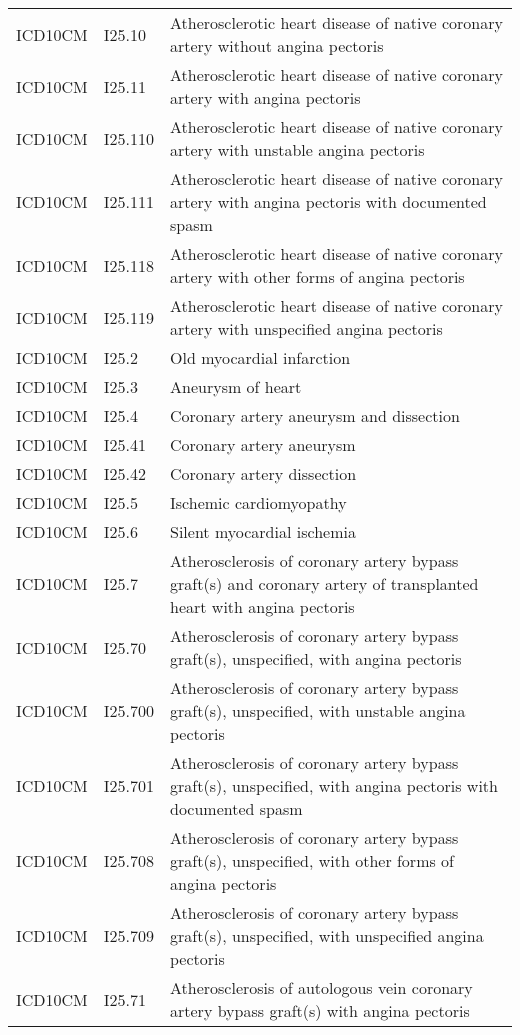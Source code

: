 \begin{longtable}{p{}p{}p{}}
  ICD10CM & I25.10 & Atherosclerotic heart disease of native coronary artery without angina pectoris \\ 
  ICD10CM & I25.11 & Atherosclerotic heart disease of native coronary artery with angina pectoris \\ 
  ICD10CM & I25.110 & Atherosclerotic heart disease of native coronary artery with unstable angina pectoris \\ 
  ICD10CM & I25.111 & Atherosclerotic heart disease of native coronary artery with angina pectoris with documented spasm \\ 
  ICD10CM & I25.118 & Atherosclerotic heart disease of native coronary artery with other forms of angina pectoris \\ 
  ICD10CM & I25.119 & Atherosclerotic heart disease of native coronary artery with unspecified angina pectoris \\ 
  ICD10CM & I25.2 & Old myocardial infarction \\ 
  ICD10CM & I25.3 & Aneurysm of heart \\ 
  ICD10CM & I25.4 & Coronary artery aneurysm and dissection \\ 
  ICD10CM & I25.41 & Coronary artery aneurysm \\ 
  ICD10CM & I25.42 & Coronary artery dissection \\ 
  ICD10CM & I25.5 & Ischemic cardiomyopathy \\ 
  ICD10CM & I25.6 & Silent myocardial ischemia \\ 
  ICD10CM & I25.7 & Atherosclerosis of coronary artery bypass graft(s) and coronary artery of transplanted heart with angina pectoris \\ 
  ICD10CM & I25.70 & Atherosclerosis of coronary artery bypass graft(s), unspecified, with angina pectoris \\ 
  ICD10CM & I25.700 & Atherosclerosis of coronary artery bypass graft(s), unspecified, with unstable angina pectoris \\ 
  ICD10CM & I25.701 & Atherosclerosis of coronary artery bypass graft(s), unspecified, with angina pectoris with documented spasm \\ 
  ICD10CM & I25.708 & Atherosclerosis of coronary artery bypass graft(s), unspecified, with other forms of angina pectoris \\ 
  ICD10CM & I25.709 & Atherosclerosis of coronary artery bypass graft(s), unspecified, with unspecified angina pectoris \\ 
  ICD10CM & I25.71 & Atherosclerosis of autologous vein coronary artery bypass graft(s) with angina pectoris \\ 

\end{longtable}
